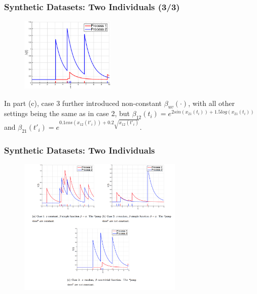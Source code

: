 \documentclass{beamer}
\begin{document}
\begin{frame}
\frametitle{Synthetic Datasets: Two Individuals (3/3)}
\begin{figure}
  \centering  
	\includegraphics[width=0.4\textwidth]{figures/case3}
  \label{fi: example 1}
\end{figure}
In part (c), case 3 further introduced non-constant $\beta_{uv}(\cdot)$, with all other settings being the same as in case 2, but $\beta_{12}(t_i) = e^{2sin(x_{21}(t_i)) + 1.5log(x_{21}(t_i))}$ and $\beta_{21}(t'_i) = e^{0.1cos(x_{12}(t'_i)) + 0.2\sqrt{x_{12}(t'_i)}}$.

\end{frame}


\begin{frame}
\frametitle{Synthetic Datasets: Two Individuals}
\begin{figure}
  \centering  
	\includegraphics[width=0.7\textwidth]{figures/rate}
  \label{fi: example 1}
\end{figure}
\end{frame}
\end{document}
